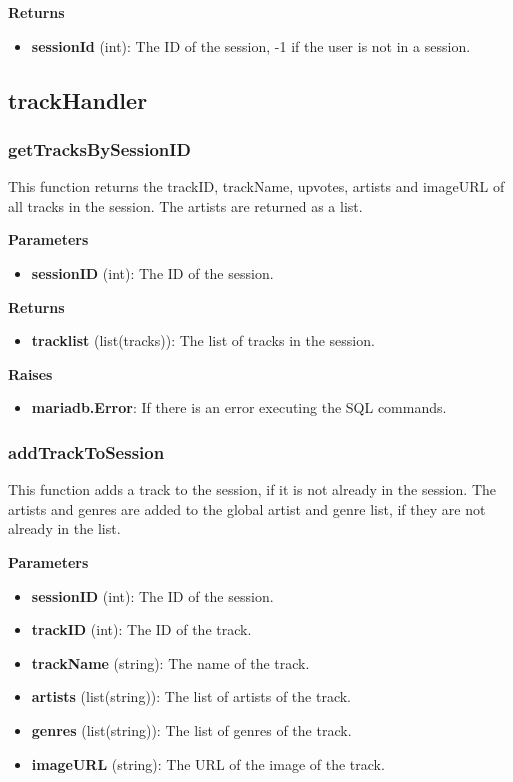 \documentclass[oneside, nenglish]{sdqtechreport}
\begin{document}
\begin{itemize}
\textbf{Returns}

\begin{itemize}
    \item \textbf{sessionId} (int): The ID of the session, -1 if the user is not in a session.
\end{itemize}



\subsection{trackHandler}

\subsubsection{getTracksBySessionID}

This function returns the trackID, trackName, upvotes, artists and imageURL of all tracks in the session. The artists are returned as a list.

\textbf{Parameters}

\begin{itemize} \item \textbf{sessionID} (int): The ID of the session. \end{itemize}

\textbf{Returns}

\begin{itemize} \item \textbf{tracklist} (list(tracks)): The list of tracks in the session. \end{itemize}

\textbf{Raises}

\begin{itemize} \item \textbf{mariadb.Error}: If there is an error executing the SQL commands. \end{itemize}

\subsubsection{addTrackToSession}

This function adds a track to the session, if it is not already in the session. The artists and genres are added to the global artist and genre list, if they are not already in the list.

\textbf{Parameters}

\begin{itemize} \item \textbf{sessionID} (int): The ID of the session. \item \textbf{trackID} (int): The ID of the track. \item \textbf{trackName} (string): The name of the track. \item \textbf{artists} (list(string)): The list of artists of the track. \item \textbf{genres} (list(string)): The list of genres of the track. \item \textbf{imageURL} (string): The URL of the image of the track. \end{itemize}


\end{itemize}
\end{document}
